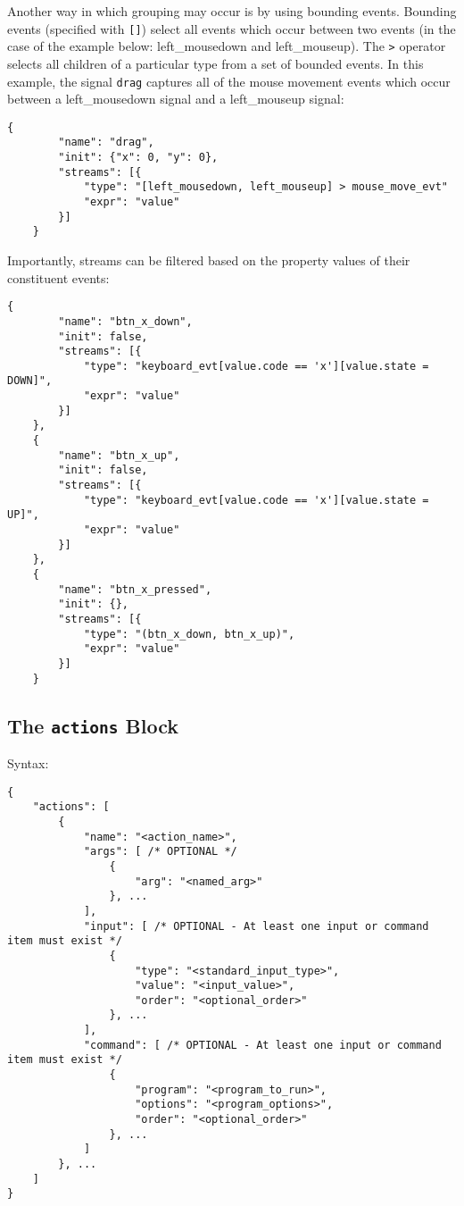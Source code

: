 \documentclass{article}
\begin{document}
Another way in which grouping may occur is by using bounding events.
Bounding events (specified with \texttt{[]}) select all events which occur between two events (in the case of the example below: left\_mousedown and left\_mouseup). The \texttt{>} operator selects all children of a particular type from a set of bounded events. In this example, the signal \texttt{drag} captures all of the mouse movement events which occur between a left\_mousedown signal and a left\_mouseup signal:

\begin{Verbatim}[baselinestretch=1.0]
    {
        "name": "drag",
        "init": {"x": 0, "y": 0},
        "streams": [{
            "type": "[left_mousedown, left_mouseup] > mouse_move_evt"
            "expr": "value"
        }]
    }
\end{Verbatim}

Importantly, streams can be filtered based on the property values of their constituent events:

\begin{Verbatim}[baselinestretch=1.0]
    {
        "name": "btn_x_down",
        "init": false,
        "streams": [{ 
            "type": "keyboard_evt[value.code == 'x'][value.state = DOWN]",
            "expr": "value"
        }]
    },
    {
        "name": "btn_x_up",
        "init": false,
        "streams": [{ 
            "type": "keyboard_evt[value.code == 'x'][value.state = UP]",
            "expr": "value"
        }]
    },
    {
        "name": "btn_x_pressed",
        "init": {},
        "streams": [{ 
            "type": "(btn_x_down, btn_x_up)",
            "expr": "value"
        }]
    }
\end{Verbatim}

\subsection{The \texttt{actions} Block}
Syntax:

\begin{Verbatim}[baselinestretch=1.0]
{
    "actions": [
        {
            "name": "<action_name>",
            "args": [ /* OPTIONAL */
                { 
                    "arg": "<named_arg>"
                }, ...
            ],
            "input": [ /* OPTIONAL - At least one input or command item must exist */
                {
                    "type": "<standard_input_type>",
                    "value": "<input_value>",
                    "order": "<optional_order>"
                }, ...
            ],
            "command": [ /* OPTIONAL - At least one input or command item must exist */
                {
                    "program": "<program_to_run>",
                    "options": "<program_options>",
                    "order": "<optional_order>"
                }, ...
            ]
        }, ...
    ]
}
\end{Verbatim}
\end{document}
